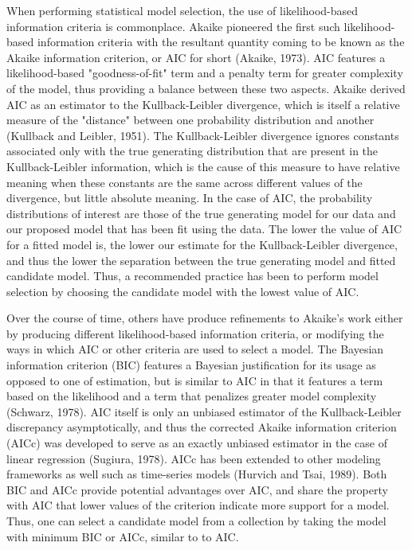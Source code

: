 		When performing statistical model selection, the use of likelihood-based information criteria is commonplace. Akaike pioneered the first such likelihood-based information criteria
		with the resultant quantity coming to be known as the Akaike information criterion, or AIC for short (Akaike, 1973). AIC features a likelihood-based "goodness-of-fit" term and a
		penalty term for greater complexity of the model, thus providing a balance between these two aspects. Akaike derived AIC as an estimator to the Kullback-Leibler divergence,
		which is itself a relative measure of the "distance" between one probability distribution and another (Kullback and Leibler, 1951). The Kullback-Leibler divergence ignores constants
		associated only with the true generating distribution that are present in the Kullback-Leibler information, which is the cause of this measure to have relative meaning when these constants
		are the same across different values of the divergence, but little absolute meaning. In the case of AIC, the probability distributions of interest are those of the true generating model
		for our data and our proposed model that has been fit using the data. The lower the value of AIC for a fitted model is, the lower our estimate for the Kullback-Leibler divergence,
		and thus the lower the separation between the true generating model and fitted candidate model. Thus, a recommended practice has been to perform model selection by choosing
		the candidate model with the lowest value of AIC.

		Over the course of time, others have produce refinements to Akaike's work either by producing different likelihood-based information criteria, or modifying the ways in which AIC or other
		criteria are used to select a model. The Bayesian information criterion (BIC) features a Bayesian justification for its usage as opposed to one of estimation, but is similar to AIC in that
		it features a term based on the likelihood and a term that penalizes greater model complexity (Schwarz, 1978). AIC itself is only an unbiased estimator of the Kullback-Leibler discrepancy
		asymptotically, and thus the corrected Akaike information criterion (AICc) was developed to serve as an exactly unbiased estimator in the case of linear regression (Sugiura, 1978). AICc has
		been extended to other modeling frameworks as well such as time-series models (Hurvich and Tsai, 1989). Both BIC and AICc provide potential advantages over AIC, and share the property with
		AIC that lower values of the criterion indicate more support for a model. Thus, one can select a candidate model from a collection by taking the model with minimum BIC or AICc, similar to
		to AIC.

